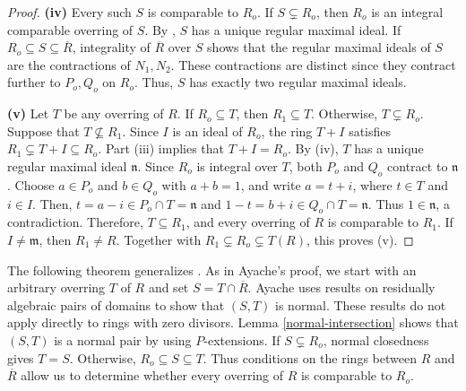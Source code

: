 \documentclass[12pt]{article}
\begin{document}
\begin{proof}
		\textbf{(iv)} Every such $S$ is comparable to $R_o$. If $S\subsetneq R_o$, then $R_o$ is an integral comparable overring of $S$. By \cite[Proposition 3.3]{marot}, $S$ has a unique regular maximal ideal. If $R_o\subseteq S\subseteq\overline R$, integrality of $\overline R$ over $S$ shows that the regular maximal ideals of $S$ are the contractions of $N_1,N_2$. These contractions are distinct since they contract further to $P_o,Q_o$ on $R_o$. Thus, $S$ has exactly two regular maximal ideals.
		
		\textbf{(v)} Let $T$ be any overring of $R$. If $R_o\subseteq T$, then $R_1\subseteq T$. Otherwise, $T\subsetneq R_o$. Suppose that $T\nsubseteq R_1$. Since $I$ is an ideal of $R_o$, the ring $T+I$ satisfies $R_1\subsetneq T+I\subseteq R_o.$ Part (iii) implies that $T+I=R_o$. By (iv), $T$ has a unique regular maximal ideal $\mathfrak n$. Since $R_o$ is integral over $T$, both $P_o$ and $Q_o$ contract to $\mathfrak n$. Choose $a\in P_o$ and $b\in Q_o$ with $a+b=1$, and write $a=t+i$, where $t\in T$ and $i\in I$. Then, $t=a-i\in P_o \cap T =\mathfrak n$ and $1-t=b+i\in Q_o\cap T=\mathfrak n.$ Thus $1\in\mathfrak n$, a contradiction. Therefore, $T\subseteq R_1$, and every overring of $R$ is comparable to $R_1$. If $I\neq\mathfrak m$, then $R_1\neq R$. Together with $R_1\subsetneq R_o\subsetneq T(R)$, this proves (v).
    \end{proof}

	The following theorem generalizes \cite[Theorem 24]{ayache}. As in Ayache's proof, we start with an arbitrary overring $T$ of $R$ and set $S=T\cap\overline R$. Ayache uses results on residually algebraic pairs of domains to show that $(S,T)$ is normal. These results do not apply directly to rings with zero divisors. Lemma \ref{normal-intersection} shows that $(S,T)$ is a normal pair by using $P$-extensions. If $S\subsetneq R_o$, normal closedness gives $T=S$. Otherwise, $R_o \subseteq S\subseteq T$. Thus conditions on the rings between $R$ and $\overline R$ allow us to determine whether every overring of $R$ is comparable to $R_o$.
\end{document}

